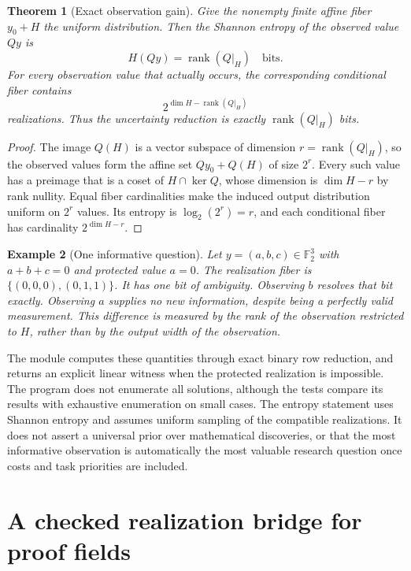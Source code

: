 \documentclass[11pt,oneside]{article}
\theoremstyle{komorebiplain}
\newtheorem{theorem}{Theorem}[section]
\theoremstyle{komorebidefinition}
\newtheorem{example}[theorem]{Example}
\theoremstyle{komorebiremark}
\begin{document}
\begin{theorem}[Exact observation gain]
\label{res:23:5}
Give the nonempty finite affine fiber $y_0+H$ the uniform distribution. Then the Shannon entropy of the observed value $Qy$ is
\[
H(Qy)=\operatorname{rank}(Q|_H)\quad\text{bits}.
\]
For every observation value that actually occurs, the corresponding conditional fiber contains
\[
2^{\dim H-\operatorname{rank}(Q|_H)}
\]
realizations. Thus the uncertainty reduction is exactly $\operatorname{rank}(Q|_H)$ bits.
\end{theorem}
\begin{proof}
The image $Q(H)$ is a vector subspace of dimension $r=\operatorname{rank}(Q|_H)$, so the observed values form the affine set $Qy_0+Q(H)$ of size $2^r$. Every such value has a preimage that is a coset of $H\cap\ker Q$, whose dimension is $\dim H-r$ by rank nullity. Equal fiber cardinalities make the induced output distribution uniform on $2^r$ values. Its entropy is $\log_2(2^r)=r$, and each conditional fiber has cardinality $2^{\dim H-r}$.
\end{proof}

\begin{example}[One informative question]
\label{res:23:6}
Let $y=(a,b,c)\in\mathbb F_2^3$ with $a+b+c=0$ and protected value $a=0$. The realization fiber is $\{(0,0,0),(0,1,1)\}$. It has one bit of ambiguity. Observing $b$ resolves that bit exactly. Observing $a$ supplies no new information, despite being a perfectly valid measurement. This difference is measured by the rank of the observation restricted to $H$, rather than by the output width of the observation.
\end{example}

The module  computes these quantities through exact binary row reduction, and returns an explicit linear witness when the protected realization is impossible. The program does not enumerate all solutions, although the tests compare its results with exhaustive enumeration on small cases. The entropy statement uses Shannon entropy \cite{cover-thomas} and assumes uniform sampling of the compatible realizations. It does not assert a universal prior over mathematical discoveries, or that the most informative observation is automatically the most valuable research question once costs and task priorities are included.


\section{A checked realization bridge for proof fields}
\label{sec:old24}
\label{sec:checked-bridge}
\end{document}
